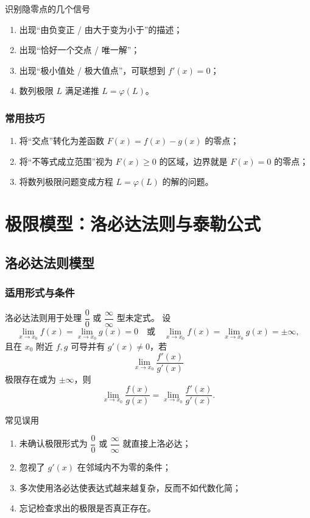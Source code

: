 \documentclass[a4paper,11pt]{ctexart}
\begin{document}
\begin{notebox}{识别隐零点的几个信号}
  \begin{enumerate}
    \item 出现“由负变正 / 由大于变为小于”的描述；
    \item 出现“恰好一个交点 / 唯一解”；
    \item 出现“极小值处 / 极大值点”，可联想到 $f'(x)=0$；
    \item 数列极限 $L$ 满足递推 $L=\varphi(L)$。
  \end{enumerate}
\end{notebox}

\subsubsection{常用技巧}

\begin{enumerate}
  \item 将“交点”转化为差函数 $F(x)=f(x)-g(x)$ 的零点；
  \item 将“不等式成立范围”视为 $F(x)\ge 0$ 的区域，边界就是 $F(x)=0$ 的零点；
  \item 将数列极限问题变成方程 $L=\varphi(L)$ 的解的问题。
\end{enumerate}

\section{极限模型：洛必达法则与泰勒公式}

\subsection{洛必达法则模型}

\subsubsection{适用形式与条件}

洛必达法则用于处理 $\dfrac{0}{0}$ 或 $\dfrac{\infty}{\infty}$ 型未定式。
设
\[
  \lim_{x\to x_0}f(x)=\lim_{x\to x_0}g(x)=0
  \quad\text{或}\quad
  \lim_{x\to x_0}f(x)=\lim_{x\to x_0}g(x)=\pm\infty,
\]
且在 $x_0$ 附近 $f,g$ 可导并有 $g'(x)\ne 0$，若
\[
  \lim_{x\to x_0}\frac{f'(x)}{g'(x)}
\]
极限存在或为 $\pm\infty$，则
\[
  \lim_{x\to x_0}\frac{f(x)}{g(x)}=\lim_{x\to x_0}\frac{f'(x)}{g'(x)}.
\]

\begin{warningbox}[mathnote coverage=soft]{常见误用}
  \begin{enumerate}
    \item 未确认极限形式为 $\dfrac{0}{0}$ 或 $\dfrac{\infty}{\infty}$ 就直接上洛必达；
    \item 忽视了 $g'(x)$ 在邻域内不为零的条件；
    \item 多次使用洛必达使表达式越来越复杂，反而不如代数化简；
    \item 忘记检查求出的极限是否真正存在。
  \end{enumerate}
\end{warningbox}
\end{document}
